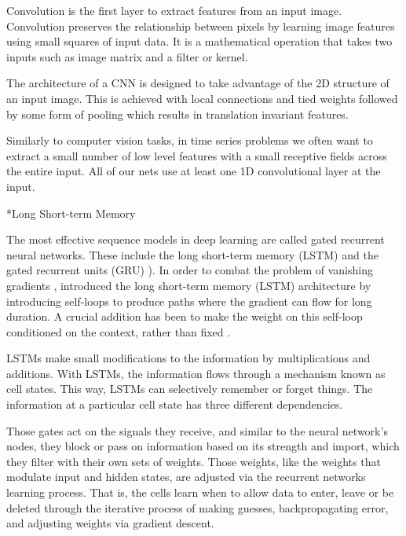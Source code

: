 \documentclass[twocolumn, a4paper,10pt]{article}
\makeatletter
\renewcommand\subsubsection{\@startsection{subsection}{1}{\z@}{0.2cm}{0.1cm}{\normalfont\normalsize\itshape}}
\makeatother
\begin{document}
Convolution is the first layer to extract features from an input image. Convolution preserves the relationship between pixels by learning image features using small squares of input data. It is a mathematical operation that takes two inputs such as image matrix and a filter or kernel.

The architecture of a CNN is designed to take advantage of the 2D structure of an input image. This is achieved with local connections and tied weights followed by some form of pooling which results in translation invariant features. 

Similarly to computer vision tasks, in time series problems we often want to extract a small number of low level features with a small receptive fields across the entire input. All of our nets use at least one 1D convolutional layer at the input.

\subsubsection*{Long Short-term Memory}

The most eﬀective sequence models in deep learning are called gated recurrent neural networks. These include the long short-term memory (LSTM) and the gated recurrent units (GRU) \citep{RN1282}). In order to combat the problem of vanishing gradients \citep{RN1289}, \cite{RN1288} introduced the long short-term memory (LSTM) architecture by introducing self-loops to produce paths where the gradient can ﬂow for long duration. A crucial addition has been to make the weight on this self-loop conditioned on the context, rather than ﬁxed \citep{RN1290}.

LSTMs make small modifications to the information by multiplications and additions. With LSTMs, the information flows through a mechanism known as cell states. This way, LSTMs can selectively remember or forget things. The information at a particular cell state has three different dependencies.

Those gates act on the signals they receive, and similar to the neural network’s nodes, they block or pass on information based on its strength and import, which they filter with their own sets of weights. Those weights, like the weights that modulate input and hidden states, are adjusted via the recurrent networks learning process. That is, the cells learn when to allow data to enter, leave or be deleted through the iterative process of making guesses, backpropagating error, and adjusting weights via gradient descent.
\end{document}
